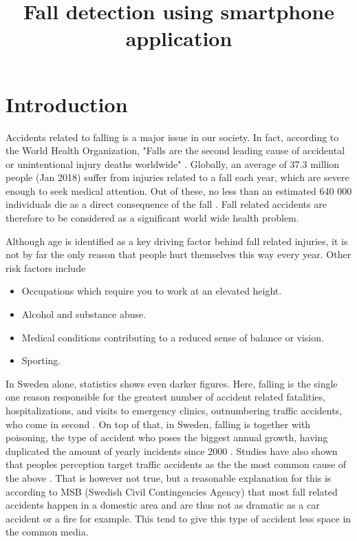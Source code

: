 \documentclass[12pt, a4paper, onecolumn]{article}
\begin{document}
	
	\title{Fall detection using smartphone application}
	\maketitle

	\tableofcontents
	\newpage
	
	\section{Introduction}
	
	Accidents related to falling is a major issue in our society. In fact, according to the World Health Organization, "Falls are the second leading cause of accidental or unintentional injury deaths worldwide" \cite{who}. Globally, an average of 37.3 million people (Jan 2018) suffer from injuries related to a fall each year, which are severe enough to seek medical attention. Out of these, no less than an estimated 640 000 individuals die as a direct consequence of the fall \cite{who}. Fall  related accidents are therefore to be considered as a significant world wide health problem. 
	
	Although age is identified as a key driving factor behind fall related injuries, it is not by far the only reason that people hurt themselves this way every year.  Other risk factors include 
	\begin{itemize}
		\item Occupations which require you to work at an elevated height.
		\item Alcohol and substance abuse.
		\item Medical conditions contributing to a reduced sense of balance or vision.
		\item Sporting.	
	\end{itemize}
	
	In Sweden alone, statistics shows even darker figures. Here, falling is the single one reason responsible for the greatest number of accident related fatalities, hospitalizations, and visits to emergency clinics, outnumbering traffic accidents, who come in second \cite[p~3,5]{msb_report}. On top of that, in Sweden, falling is together with poisoning, the type of accident who poses the biggest annual growth, having duplicated the amount of yearly incidents since 2000 \cite{soc_olyckor}. Studies have also shown that peoples perception target traffic accidents as the the most common cause of the above \cite[p~5]{msb_report}. That is however not true, but a reasonable explanation for this is according to MSB (Swedish Civil Contingencies Agency) that most fall related accidents happen in a domestic area and are thus not as dramatic as a car accident or a fire for example. This tend to give this type of accident less space in the common media. 
	
\end{document}
